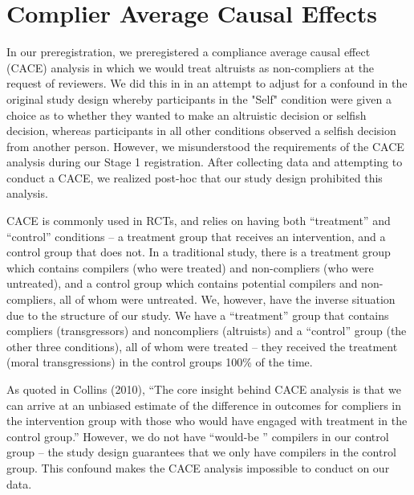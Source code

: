 \documentclass[12pt,]{article}
\begin{document}


\clearpage
\section{Complier Average Causal Effects}
\label{appendix:CACE}

In our preregistration, we preregistered a compliance average causal effect (CACE) analysis in which we would treat altruists as non-compliers at the request of reviewers. We did this in in an attempt to adjust for a confound in the original study design whereby participants in the "Self" condition were given a choice as to whether they wanted to make an altruistic decision or selfish decision, whereas participants in all other conditions observed a selfish decision from another person. However, we misunderstood the requirements of the CACE analysis during our Stage 1 registration. After collecting data and attempting to conduct a CACE, we realized post-hoc that our study design prohibited this analysis. 

CACE is commonly used in RCTs, and relies on having both “treatment” and “control” conditions – a treatment group that receives an intervention, and a control group that does not. In a traditional study, there is a treatment group which contains compilers (who were treated) and non-compliers (who were untreated), and a control group which contains potential compilers and non-compliers, all of whom were untreated. We, however, have the inverse situation due to the structure of our study. We have a “treatment” group that contains compliers (transgressors) and noncompliers (altruists) and a “control” group (the other three conditions), all of whom were treated – they received the treatment (moral transgressions) in the control groups 100\% of the time. 

As quoted in Collins (2010), “The core insight behind CACE analysis is that we can arrive at an unbiased estimate of the difference in outcomes for compliers in the intervention group with those who would have engaged with treatment in the control group.” However, we do not have “would-be '' compilers in our control group – the study design guarantees that we only have compilers in the control group. This confound makes the CACE analysis impossible to conduct on our data. 
\end{document}
